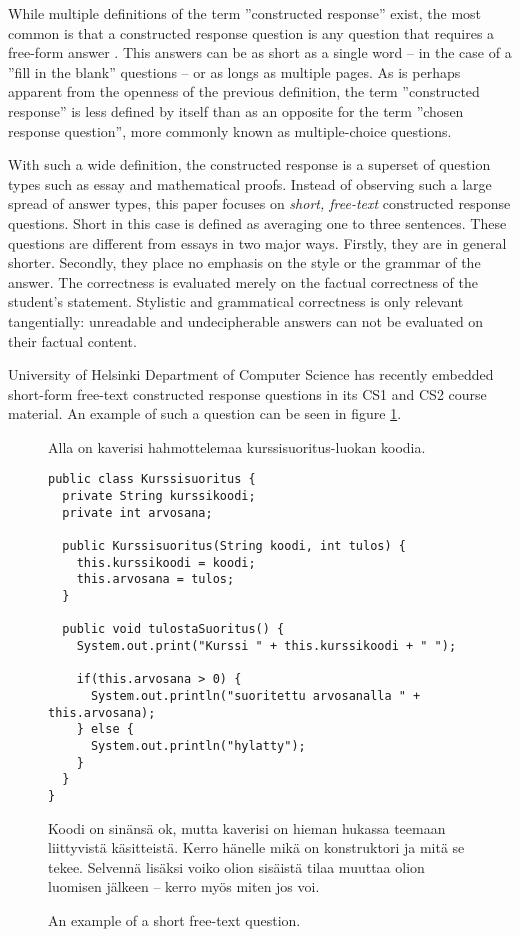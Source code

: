 \documentclass[english]{tktltiki2}
\theoremstyle{definition}
\theoremstyle{remark}
\begin{document}
While multiple definitions of the term ''constructed response'' exist, the most common is that a constructed response question is any question that requires a free-form answer \cite{bennett91}. This answers can be as short as a single word -- in the case of a ''fill in the blank'' questions -- or as longs as multiple pages. As is perhaps apparent from the openness of the previous definition, the term ''constructed response'' is less defined by itself than as an opposite for the term ''chosen response question'', more commonly known as multiple-choice questions.

With such a wide definition, the constructed response is a superset of question types such as essay and mathematical proofs. 
Instead of observing such a large spread of answer types, this paper focuses on \emph{short, free-text} constructed response questions. Short in this case is defined as averaging one to three sentences. These questions are different from essays in two major ways. Firstly, they are in general shorter. Secondly, they place no emphasis on the style or the grammar of the answer. The correctness is evaluated merely on the factual correctness of the student's statement. Stylistic and grammatical correctness is only relevant tangentially: unreadable and undecipherable answers can not be evaluated on their factual content.

University of Helsinki Department of Computer Science has recently embedded short-form free-text constructed response questions in its CS1 and CS2 course material. An example of such a question can be seen in figure \ref{fig:selitystehtava}.

\begin{figure}[h!]
	\begin{mdframed}
		Alla on kaverisi hahmottelemaa kurssisuoritus-luokan koodia.

		\begin{lstlisting}
public class Kurssisuoritus {
  private String kurssikoodi;
  private int arvosana;

  public Kurssisuoritus(String koodi, int tulos) {
    this.kurssikoodi = koodi;
    this.arvosana = tulos;
  }
    
  public void tulostaSuoritus() {
    System.out.print("Kurssi " + this.kurssikoodi + " ");
        
    if(this.arvosana > 0) {
      System.out.println("suoritettu arvosanalla " + this.arvosana);
    } else {
      System.out.println("hylatty");
    }
  }
}
		\end{lstlisting}
	
		Koodi on sinänsä ok, mutta kaverisi on hieman hukassa teemaan liittyvistä käsitteistä. Kerro hänelle mikä on konstruktori ja mitä se tekee. Selvennä lisäksi voiko olion sisäistä tilaa muuttaa olion luomisen jälkeen -- kerro myös miten jos voi. 
	\end{mdframed}
	\caption{An example of a short free-text question.}
	\label{fig:selitystehtava}
\end{figure}
\end{document}
